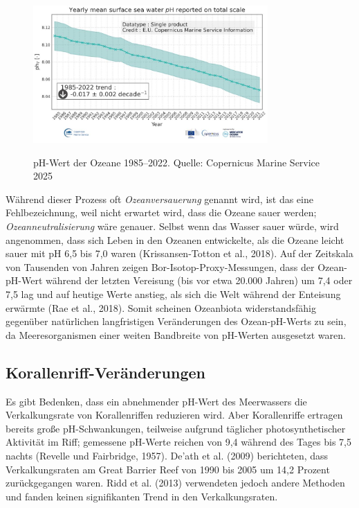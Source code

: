 \documentclass[12pt,paper=a4,DIV=12,parskip=never,chapterprefix=false,headings=standardclasses]{scrreprt}
\numberwithin{figure}{chapter}
\begin{document}
\begin{figure}[H]
\begin{center}
\includegraphics[width=0.8\textwidth]{bilder/bilderKlima-0004.jpg}\\[1cm]
\end{center}
\caption{pH-Wert der Ozeane 1985–2022. Quelle: Copernicus Marine Service 2025}
\end{figure}

Während dieser Prozess oft \emph{Ozeanversauerung} genannt wird, ist das eine Fehlbezeichnung, weil nicht erwartet wird, dass die Ozeane sauer werden; \emph{Ozeanneutralisierung} wäre genauer. Selbst wenn das Wasser sauer würde, wird angenommen, dass sich Leben in den Ozeanen entwickelte, als die Ozeane leicht sauer mit pH 6,5 bis 7,0 waren (Krissansen-Totton et al., 2018). Auf der Zeitskala von Tausenden von Jahren zeigen Bor-Isotop-Proxy-Messungen, dass der Ozean-pH-Wert während der letzten Vereisung (bis vor etwa 20.000 Jahren) um 7,4 oder 7,5 lag und auf heutige Werte anstieg, als sich die Welt während der Enteisung erwärmte (Rae et al., 2018). Somit scheinen Ozeanbiota widerstandsfähig gegenüber natürlichen langfristigen Veränderungen des Ozean-pH-Werts zu sein, da Meeresorganismen einer weiten Bandbreite von pH-Werten ausgesetzt waren.

\subsection{Korallenriff-Veränderungen}

Es gibt Bedenken, dass ein abnehmender pH-Wert des Meerwassers die Verkalkungsrate von Korallenriffen reduzieren wird. Aber Korallenriffe ertragen bereits große pH-Schwankungen, teilweise aufgrund täglicher photosynthetischer Aktivität im Riff; gemessene pH-Werte reichen von 9,4 während des Tages bis 7,5 nachts (Revelle und Fairbridge, 1957). De'ath et al. (2009) berichteten, dass Verkalkungsraten am Great Barrier Reef von 1990 bis 2005 um 14,2 Prozent zurückgegangen waren. Ridd et al. (2013) verwendeten jedoch andere Methoden und fanden keinen signifikanten Trend in den Verkalkungsraten.
\end{document}
